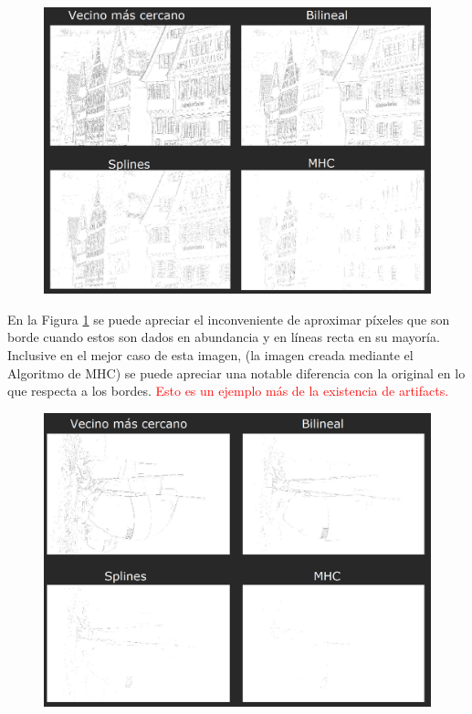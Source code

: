 \documentclass[a4paper]{article}
\begin{document}
\begin{figure}[h!]
	\caption{}
	\begin{center}
	\includegraphics[scale=0.40]{imagenes/comparacion/04/collage}
	\label{imagen4}
  \end{center}
\end{figure}

En la Figura \ref{imagen4} se puede apreciar el inconveniente de aproximar p\'ixeles que son borde cuando estos son dados en abundancia y en l\'ineas recta en su mayor\'ia. Inclusive en el mejor caso de esta imagen, (la imagen creada mediante el Algoritmo de MHC) se puede apreciar una notable diferencia con la original en lo que respecta a los bordes. \textcolor{red}{Esto es un ejemplo m\'as de la existencia de artifacts.}\\

\newpage


\begin{figure}[h!]
	\caption{}
	\begin{center}
	\includegraphics[scale=0.40]{imagenes/comparacion/05/collage}
	\label{imagen5}
  \end{center}
\end{figure}
\end{document}
